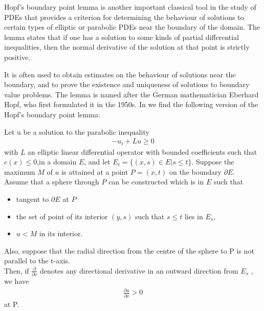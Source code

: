 Hopf's boundary point lemma is another important classical tool in the study of PDEs that provides a criterion for determining the behaviour of solutions to certain types of elliptic or parabolic PDEs near the boundary of the domain. The lemma states that if one has a solution to some kinds of partial differential inequalities, then the normal derivative of the solution at that point is strictly positive.

It is often used to obtain estimates on the behaviour of solutions near the boundary, and to prove the existence and uniqueness of solutions to boundary value problems. The lemma is named after the German mathematician Eberhard Hopf, who first formulated it in the 1950s. In \cite{protterweinberger} we find the following version of the Hopf's boundary point lemma:

\begin{theorem}
	Let u be a solution to the parabolic inequality 
	\begin{align*}
		-u_t+Lu\geq 0
	\end{align*} 
	with $L$ an elliptic linear differential operator with bounded coefficients such that $c(x)\leq 0$,in a domain $E$, and let $E_t = \{(x, s) \in E | s \leq t\}$. Suppose the maximum $M$ of $u$ is attained at a point $P=(x, t)$ on the boundary $\partial E$. \\
	Assume that a sphere through $P$ can be constructed which is in $E$ such that
	\begin{itemize}\itemsep0em 
		\item tangent to $\partial E$ at $P$
		\item the set of point of its interior $(y, s)$ such that $s\leq t$ lies in $E_s$, 
		\item  $u < M$ in its interior.
	\end{itemize}	
	Also, suppose that the radial direction from the centre of the sphere to P is not parallel to the t-axis. \\
	Then, if $\frac{\partial}{\partial \nu}$ denotes any directional derivative in an outward direction from $E_s$ , we have
	\begin{align*}
		\frac{\partial u}{\partial \nu} > 0
	\end{align*}
	at P.\label{HopfBPL}
\end{theorem}

